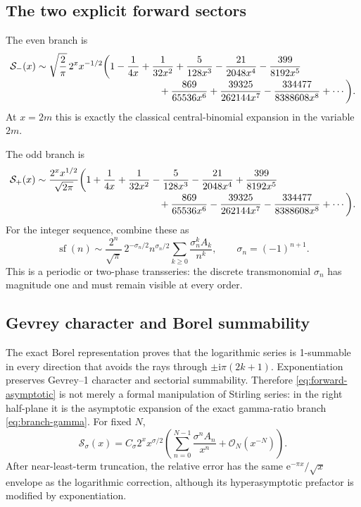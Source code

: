 \documentclass[11pt,a4paper]{article}
\numberwithin{equation}{section}
\theoremstyle{definition}
\theoremstyle{remark}
\newcommand{\e}{\mathrm e}
\newcommand{\ii}{\mathrm i}
\newcommand{\Ord}{\mathcal O}
\newcommand{\SF}{\operatorname{sf}}
\begin{document}
\subsection{The two explicit forward sectors}

The even branch is
\begin{align}\label{eq:even-forward}
 \mathcal S_-(x)
 &\sim\sqrt{\frac2\pi}\,2^xx^{-1/2}
 \biggl(
 1-\frac1{4x}+\frac1{32x^2}+\frac5{128x^3}
 -\frac{21}{2048x^4}-\frac{399}{8192x^5}\\[-1mm]
 &\hspace{44mm}
 +\frac{869}{65536x^6}+\frac{39325}{262144x^7}
 -\frac{334477}{8388608x^8}+\cdots
 \biggr).\notag
\end{align}
At \(x=2m\) this is exactly the classical central-binomial expansion in the
variable \(2m\).

The odd branch is
\begin{align}\label{eq:odd-forward}
 \mathcal S_+(x)
 &\sim\frac{2^x x^{1/2}}{\sqrt{2\pi}}
 \biggl(
 1+\frac1{4x}+\frac1{32x^2}-\frac5{128x^3}
 -\frac{21}{2048x^4}+\frac{399}{8192x^5}\\[-1mm]
 &\hspace{44mm}
 +\frac{869}{65536x^6}-\frac{39325}{262144x^7}
 -\frac{334477}{8388608x^8}+\cdots
 \biggr).\notag
\end{align}
For the integer sequence, combine these as
\begin{equation}\label{eq:integer-forward-unified}
 \SF(n)\sim
 \frac{2^n}{\sqrt\pi}\,2^{-\sigma_n/2}n^{\sigma_n/2}
 \sum_{k\ge0}\frac{\sigma_n^kA_k}{n^k},
 \qquad \sigma_n=(-1)^{n+1}.
\end{equation}
This is a periodic or two-phase transseries: the discrete transmonomial
\(\sigma_n\) has magnitude one and must remain visible at every order.

\subsection{Gevrey character and Borel summability}

The exact Borel representation proves that the logarithmic series is
1-summable in every direction that avoids the rays through
\(\pm\ii\pi(2k+1)\).  Exponentiation preserves Gevrey--1 character and
sectorial summability.  Therefore \cref{eq:forward-asymptotic} is not merely
a formal manipulation of Stirling series: in the right half-plane it is the
asymptotic expansion of the exact gamma-ratio branch
\cref{eq:branch-gamma}.  For fixed \(N\),
\begin{equation}\label{eq:forward-error-fixed}
 \mathcal S_\sigma(x)=C_\sigma2^xx^{\sigma/2}
 \left(\sum_{n=0}^{N-1}\frac{\sigma^nA_n}{x^n}
 +\Ord_N(x^{-N})\right).
\end{equation}
After near-least-term truncation, the relative error has the same
\(\e^{-\pi x}/\sqrt{x}\) envelope as the logarithmic correction, although
its hyperasymptotic prefactor is modified by exponentiation.
\end{document}
